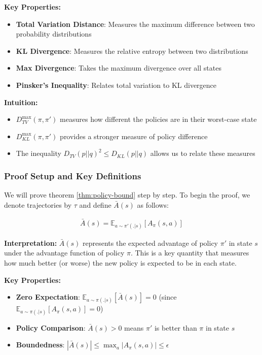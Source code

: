 \textbf{Key Properties:}
\begin{itemize}
    \item \textbf{Total Variation Distance}: Measures the maximum difference between two probability distributions
    \item \textbf{KL Divergence}: Measures the relative entropy between two distributions
    \item \textbf{Max Divergence}: Takes the maximum divergence over all states
    \item \textbf{Pinsker's Inequality}: Relates total variation to KL divergence
\end{itemize}

\textbf{Intuition:}
\begin{itemize}
    \item $D_{TV}^{\max}(\pi, \pi')$ measures how different the policies are in their worst-case state
    \item $D_{KL}^{\max}(\pi, \pi')$ provides a stronger measure of policy difference
    \item The inequality $D_{TV}(p||q)^2 \le D_{KL}(p||q)$ allows us to relate these measures
\end{itemize}

\subsubsection{Proof Setup and Key Definitions}

We will prove theorem \ref{thm:policy-bound} step by step. To begin the proof, we denote trajectories by $\tau$ and define $\bar{A}(s)$ as follows:

\begin{align*}
    \bar{A}(s) = \mathbb{E}_{a \sim \pi'(.|s)}[A_{\pi}(s, a)]
\end{align*}

\textbf{Interpretation:}
$\bar{A}(s)$ represents the expected advantage of policy $\pi'$ in state $s$ under the advantage function of policy $\pi$. This is a key quantity that measures how much better (or worse) the new policy is expected to be in each state.

\textbf{Key Properties:}
\begin{itemize}
    \item \textbf{Zero Expectation}: $\mathbb{E}_{a \sim \pi(.|s)}[\bar{A}(s)] = 0$ (since $\mathbb{E}_{a \sim \pi(.|s)}[A_{\pi}(s,a)] = 0$)
    \item \textbf{Policy Comparison}: $\bar{A}(s) > 0$ means $\pi'$ is better than $\pi$ in state $s$
    \item \textbf{Boundedness}: $|\bar{A}(s)| \leq \max_{a} |A_{\pi}(s,a)| \leq \epsilon$
\end{itemize}

